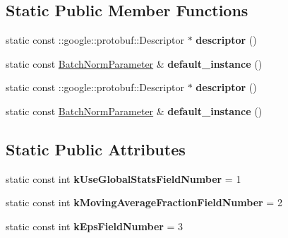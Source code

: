 \subsection*{Static Public Member Functions}
\begin{DoxyCompactItemize}
\item 
\mbox{\label{classcaffe_1_1_batch_norm_parameter_a38d8707319a08e3b9bf24db3cc9faeda}} 
static const \+::google\+::protobuf\+::\+Descriptor $\ast$ {\bfseries descriptor} ()
\item 
\mbox{\label{classcaffe_1_1_batch_norm_parameter_ae85712ca5e87a3a9aba6b4710d69a6ca}} 
static const \mbox{\hyperlink{classcaffe_1_1_batch_norm_parameter}{Batch\+Norm\+Parameter}} \& {\bfseries default\+\_\+instance} ()
\item 
\mbox{\label{classcaffe_1_1_batch_norm_parameter_aeea9750568332c3a60841783f47b3438}} 
static const \+::google\+::protobuf\+::\+Descriptor $\ast$ {\bfseries descriptor} ()
\item 
\mbox{\label{classcaffe_1_1_batch_norm_parameter_ab8e31a1ddc00cf726bfe73aa5ec96348}} 
static const \mbox{\hyperlink{classcaffe_1_1_batch_norm_parameter}{Batch\+Norm\+Parameter}} \& {\bfseries default\+\_\+instance} ()
\end{DoxyCompactItemize}
\subsection*{Static Public Attributes}
\begin{DoxyCompactItemize}
\item 
\mbox{\label{classcaffe_1_1_batch_norm_parameter_a36950dbffc77579bed08340f8e1570bb}} 
static const int {\bfseries k\+Use\+Global\+Stats\+Field\+Number} = 1
\item 
\mbox{\label{classcaffe_1_1_batch_norm_parameter_aed7ee2ee8fe15476f50e22898f18b921}} 
static const int {\bfseries k\+Moving\+Average\+Fraction\+Field\+Number} = 2
\item 
\mbox{\label{classcaffe_1_1_batch_norm_parameter_a08d7e287e9deaacdeba339f68262a93b}} 
static const int {\bfseries k\+Eps\+Field\+Number} = 3
\end{DoxyCompactItemize}
